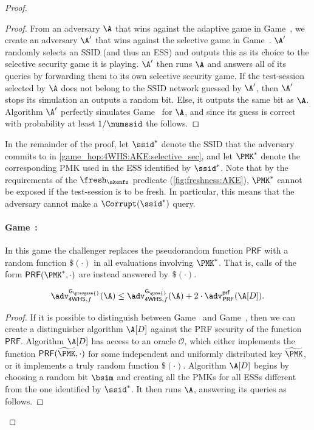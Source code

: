 \begin{proof}
\begin{proof}
From an adversary $\A$ that wins against the adaptive game in Game~\prevgame{},
we create an adversary $\A'$ that wins against the selective game in Game~\game{}. 
$\A'$ randomly selects an SSID
(and thus an ESS)
and outputs this as its choice to the selective security game it is playing.
$\A'$ then runs $\A$ and answers all of its queries by forwarding them to its own selective security game. 
If the test-session selected by $\A$ does not belong to the SSID network guessed by $\A'$,
then $\A'$ stops its simulation an outputs a random bit.
Else,
it outputs the same bit as $\A$.
Algorithm $\A'$ perfectly simulates Game~\prevgame{} for $\A$,
and since its guess is correct with probability at least $1 / \numssid$ the  follows.
\end{proof}

In the remainder of the proof,
let $\ssid^*$ denote the SSID that the adversary commits to in \cref{game_hop:4WHS:AKE:selective_sec},
and let $\PMK^*$ denote the corresponding PMK used in the ESS identified by $\ssid^*$. 
Note that by the requirements of the $\fresh_{\akenfs}$ predicate  
(\cref{fig:freshness:AKE}),
$\PMK^*$ cannot be exposed if the test-session is to be fresh. 
In particular,
this means that the adversary cannot make a $\Corrupt(\ssid^*)$ query.

\newgame
\paragraph{Game~\game:}\label{game_hop:4WHS:AKE:PRF-to-random}
In this game the challenger replaces the pseudorandom function $\mathsf{PRF}$
with a random function $\$(\cdot)$ in all evaluations involving  $\PMK^*$.
That is, calls of the form $\mathsf{PRF}(\PMK^*,\cdot)$ are instead answered by~$\$(\cdot)$.

\begin{claim}\label{lemma:4WHS:AKE:PRF-to-random}
\begin{equation}
	\adv_{\mathsf{4WHS},f}^{\mathsf{G_{\prevgame{}}}}(\A) 
	\leq  \adv_{\mathsf{4WHS},f}^{\mathsf{G_{\game{}}}}(\A)
	+ 2 \cdot \adv_{\mathsf{PRF}}^{\mathsf{prf}}(\A[D]) .
\end{equation}
\end{claim}

\begin{proof}
If it is possible to distinguish between Game~\prevgame{} and Game~\game{},
then we can create a distinguisher algorithm $\A[D]$ against the PRF security of the function $\mathsf{PRF}$.
Algorithm $\A[D]$ has access to an oracle $\mathcal{O}$,
which either implements the function $\mathsf{PRF}(\widetilde{\PMK}, \cdot)$ for some independent and uniformly distributed key $\widetilde{\PMK}$,
or it implements a truly random function $\$(\cdot)$.
Algorithm $\A[D]$ begins by choosing a random bit $\bsim$ and creating all the PMKs for all ESSs different from the one identified by $\ssid^*$.
It then runs $\A$,
answering its queries as follows.


\end{proof}
\end{proof}
